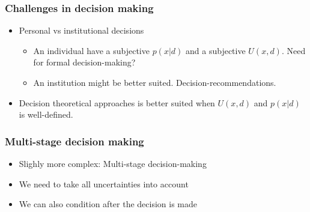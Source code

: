 \documentclass[10pt]{beamer}
\begin{document}
\begin{frame}

\frametitle{Challenges in decision making}

  \begin{itemize}
  \item Personal vs institutional decisions
  \begin{itemize}
     \item An individual have a subjective $p(x|d)$ and a subjective $U(x, d)$. Need for formal decision-making?
     \pause
     \item An institution might be better suited. Decision-recommendations.
  \end{itemize}
  \item Decision theoretical approaches is better suited when $U(x,d)$ and $p(x|d)$ is well-defined.
  \end{itemize}
\end{frame}

\begin{frame}

\frametitle{Multi-stage decision making}

  \begin{itemize}
  \item Slighly more complex: Multi-stage decision-making
  \item We need to take all uncertainties into account
  \item We can also condition after the decision is made
  \end{itemize}
\end{frame}
\end{document}

